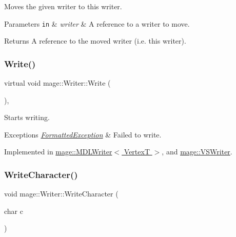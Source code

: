 Moves the given writer to this writer.


\begin{DoxyParams}[1]{Parameters}
\mbox{\tt in}  & {\em writer} & A reference to a writer to move. \\
\hline
\end{DoxyParams}
\begin{DoxyReturn}{Returns}
A reference to the moved writer (i.\+e. this writer). 
\end{DoxyReturn}
\hypertarget{classmage_1_1_writer_a9baf695ef7f6180bef883f60bcb3ac07}{}\label{classmage_1_1_writer_a9baf695ef7f6180bef883f60bcb3ac07} 
\subsubsection{\texorpdfstring{Write()}{Write()}}
{\footnotesize\ttfamily virtual void mage\+::\+Writer\+::\+Write (\begin{DoxyParamCaption}{ }\end{DoxyParamCaption})\hspace{0.3cm}{\ttfamily [private]}, {}}

Starts writing.


\begin{DoxyExceptions}{Exceptions}
{\em \hyperlink{classmage_1_1_formatted_exception}{Formatted\+Exception}} & Failed to write. \\
\hline
\end{DoxyExceptions}


Implemented in \hyperlink{classmage_1_1_m_d_l_writer_aa326a70b449baae2d7db8043e2731327}{mage\+::\+M\+D\+L\+Writer$<$ Vertex\+T $>$}, and \hyperlink{classmage_1_1_v_s_writer_a417c8bcf7ab26e88b253e9ffbdb60192}{mage\+::\+V\+S\+Writer}.

\hypertarget{classmage_1_1_writer_aa1ef04f5e69c44afda56704c2823316c}{}\label{classmage_1_1_writer_aa1ef04f5e69c44afda56704c2823316c} 
\subsubsection{\texorpdfstring{Write\+Character()}{WriteCharacter()}}
{\footnotesize\ttfamily void mage\+::\+Writer\+::\+Write\+Character (\begin{DoxyParamCaption}\item[{char}]{c }\end{DoxyParamCaption})\hspace{0.3cm}{\ttfamily [protected]}}

